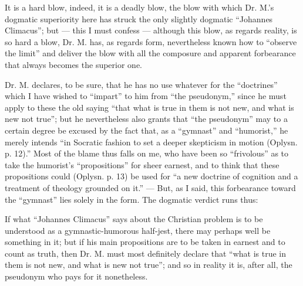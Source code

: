 \documentclass[12pt,a4paper,openany]{book}
\newcommand{\opage}[1]{\marginnote{\footnotesize\textit{[#1]}}}
\begin{document}
It is a hard blow, indeed, it is a deadly blow,
the blow with which Dr. M.'s dogmatic superiority here
has struck the only slightly dogmatic ``Johannes Climacus'';
but --- this I must confess --- although this blow, as regards
reality, is so hard a blow, Dr. M. has, as regards
form, nevertheless known how to ``observe the limit'' and
deliver the blow with all the composure and apparent forbearance
that always becomes the superior one.

Dr. M. declares, to be sure, that he has no use whatever
for the ``doctrines'' which I have wished to ``impart'' to him
from ``the pseudonym,'' since he must apply to these the old
saying ``that what is true in them is not new, and what is new not true'';
but he nevertheless also grants that ``the pseudonym'' may to
a certain degree be excused by the fact that, as a ``gymnast''
and ``humorist,'' he merely intends ``in Socratic
fashion to set a deeper skepticism in motion (Oplysn.
p. 12).'' Most of the blame thus falls on me, who have
been so ``frivolous'' as to take the humorist's ``propositions'' for
sheer earnest, and to think that these propositions could (Oplysn.
p. 13) be used for ``a new doctrine of cognition and a treatment
of theology grounded on it.'' --- But, as I said,
this forbearance toward the ``gymnast'' lies solely in
the form. The dogmatic verdict runs thus:

If what ``Johannes Climacus'' says about the Christian
problem is to be understood as a gymnastic-humorous half-jest,
there may perhaps well be something in it; but if his
main propositions are to be taken in earnest and to count as
\setcounter{footnote}{0}%
\opage{70}truth, then Dr. M. must most definitely declare that ``what is
true in them is not new, and what is new not true''; and so in reality
it is, after all, the pseudonym who pays for it nonetheless.
\end{document}
